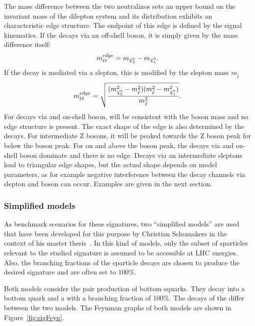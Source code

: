 The mass difference between the two neutralinos sets an upper bound on the invariant mass of the dilepton system \mll and its distribution exhibits an characteristic edge structure. The endpoint of this edge is defined by the signal kinematics.  If the \secondchi decays via an off-shell \Z boson, it is simply given by the mass difference itself:
\begin{equation}
m_{\ell\ell}^{edge} = m_{{\tilde{\chi}^0_2}} - m_{{\tilde{\chi}^0_1}}.
\end{equation}
If the decay is mediated via a slepton, this is modified by the slepton mass $m_{\tilde{\ell}}$
\begin{equation}
m_{\ell\ell}^{edge} = \sqrt{\frac{(m_{{\tilde{\chi}^0_2}}^2-m_{\tilde{\ell}}^2)(m_{\tilde{\ell}}^2-m_{{\tilde{\chi}^0_1}}^2)}{m_{\tilde{\ell}}^2}}. 
\end{equation}
For decays via and on-shell \Z boson, \mll will be consistent with the \Z boson mass and no edge structure is present. The exact shape of the edge is also determined by the decays. For intermediate Z bosons, it will be peaked towards the Z boson peak for \mlledge below the \Z boson peak. For \mlledge on and above the \Z boson peak, the decays via and on-shell \Z boson dominate and there is no edge. Decays via an intermediate sleptons lead to triangular edge shapes, but the actual shape depends on model parameters, as for example negative interference between the decay channels via slepton and \Z boson can occur. Examples are given in the next section.
\subsubsection{Simplified models}
\label{sec:models}
As benchmark scenarios for these signatures, two ``simplified models'' are used that have been developed for this purpose by Christian Schomakers in the context of his master thesis~\cite{Schomakers:2014zza}. In this kind of models, only the subset of sparticles relevant to the studied signature is assumed to be accessible at LHC energies. Also, the branching fractions of the sparticle decays are chosen to produce the desired signature and are often set to 100\%.  

Both models consider the pair production of bottom squarks. They decay into a bottom quark and a \secondchi with a branching fraction of 100\%. The decays of the \secondchi differ between the two models. The Feynman graphs of both models are shown in Figure~\ref{fig:sigFeyn}.

